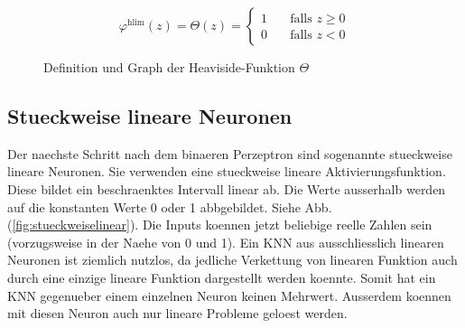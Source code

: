 \begin{figure}[h!]
  \begin{minipage}[h!]{0.5\textwidth}
    \begin{equation*}
      \varphi^{\text{hlim}}(z) = \Theta(z) =
      \begin{cases}
        1 & \quad \text{falls } z \geq 0\\
        0 & \quad \text{falls } z < 0
      \end{cases}
    \end{equation*}

  \end{minipage}
  \begin{minipage}[h!]{0.5\textwidth}
    \centering
  \end{minipage}

  \caption{Definition und Graph der Heaviside-Funktion $\Theta$}
  \label{fig:heaviside}
\end{figure}

\subsection{Stueckweise lineare Neuronen}
Der naechste Schritt nach dem binaeren Perzeptron sind sogenannte stueckweise
lineare Neuronen.
Sie verwenden eine stueckweise lineare Aktivierungsfunktion. Diese bildet ein
beschraenktes Intervall linear ab. Die Werte ausserhalb werden auf die
konstanten Werte 0 oder 1 abbgebildet. Siehe Abb. (\ref{fig:stueckweiselinear}).
\para{}
Die Inputs koennen jetzt beliebige reelle Zahlen sein (vorzugsweise in der Naehe
von 0 und 1).
Ein KNN aus ausschliesslich linearen Neuronen ist ziemlich nutzlos, da jedliche Verkettung von
linearen Funktion auch durch eine einzige lineare Funktion dargestellt werden
koennte. Somit hat ein KNN gegenueber einem einzelnen Neuron keinen Mehrwert.
Ausserdem koennen mit diesen Neuron auch nur lineare Probleme geloest werden.

